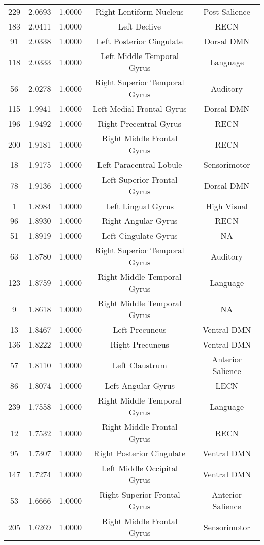 \documentclass[10pt,letterpaper]{article}\usepackage[]{graphicx}\usepackage[]{color}
\begin{document}
\begin{center}
\begin{longtable}[c]{ccccc}
	229	& 2.0693 & 1.0000 & Right Lentiform Nucleus & Post Salience \\
	183	& 2.0411 & 1.0000 & Left Declive & RECN \\
	91	& 2.0338 & 1.0000 & Left Posterior Cingulate & Dorsal DMN \\
	118	& 2.0333 & 1.0000 & Left Middle Temporal Gyrus & Language \\
	56	& 2.0278 & 1.0000 & Right Superior Temporal Gyrus & Auditory \\
	115	& 1.9941 & 1.0000 & Left Medial Frontal Gyrus & Dorsal DMN \\
	196	& 1.9492 & 1.0000 & Right Precentral Gyrus & RECN \\
	200	& 1.9181 & 1.0000 & Right Middle Frontal Gyrus & RECN \\
	18	& 1.9175 & 1.0000 & Left Paracentral Lobule & Sensorimotor \\
	78	& 1.9136 & 1.0000 & Left Superior Frontal Gyrus & Dorsal DMN \\
	1	& 1.8984 & 1.0000 & Left Lingual Gyrus & High Visual \\
	96	& 1.8930 & 1.0000 & Right Angular Gyrus & RECN \\
	51	& 1.8919 & 1.0000 & Left Cingulate Gyrus & NA \\
	63	& 1.8780 & 1.0000 & Right Superior Temporal Gyrus & Auditory \\
	123	& 1.8759 & 1.0000 & Right Middle Temporal Gyrus & Language \\
	9	& 1.8618 & 1.0000 & Right Middle Temporal Gyrus & NA \\
	13	& 1.8467 & 1.0000 & Left Precuneus & Ventral DMN \\
	136	& 1.8222 & 1.0000 & Right Precuneus & Ventral DMN \\
	57	& 1.8110 & 1.0000 & Left Claustrum & Anterior Salience \\
	86	& 1.8074 & 1.0000 & Left Angular Gyrus & LECN \\
	239	& 1.7558 & 1.0000 & Right Middle Temporal Gyrus & Language \\
	12	& 1.7532 & 1.0000 & Right Middle Frontal Gyrus & RECN \\
	95	& 1.7307 & 1.0000 & Right Posterior Cingulate & Ventral DMN \\
	147	& 1.7274 & 1.0000 & Left Middle Occipital Gyrus & Ventral DMN \\
	53	& 1.6666 & 1.0000 & Right Superior Frontal Gyrus & Anterior Salience \\
	205	& 1.6269 & 1.0000 & Right Middle Frontal Gyrus & Sensorimotor \\

\end{longtable}
\end{center}
\end{document}
